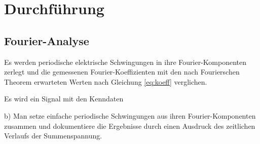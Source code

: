 \section{Durchführung}
\label{sec:Durchfuehrung}
\subsection{Fourier-Analyse}
Es werden periodische elektrische Schwingungen in ihre Fourier-Komponenten zerlegt und die gemessenen Fourier-Koeffizienten mit den nach Fourierschen Theorem erwarteten Werten nach Gleichung \ref{eq:koeff} verglichen.

Es wird ein Signal mit den Kenndaten

b) Man setze einfache periodische Schwingungen aus ihren Fourier-Komponenten zusammen und dokumentiere die Ergebnisse durch einen Ausdruck des zeitlichen Verlaufs der Summenspannung.
